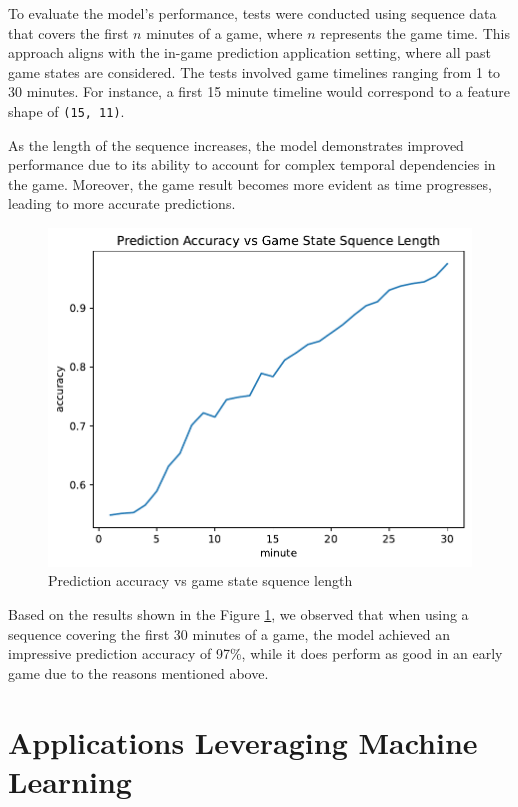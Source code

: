 \documentclass[11pt,a4paper,oneside]{report}
\begin{document}
To evaluate the model's performance, tests were conducted using sequence data that covers the first $n$ minutes of a game, where $n$ represents the game time. This approach aligns with the in-game prediction application setting, where all past game states are considered. The tests involved game timelines ranging from 1 to 30 minutes. For instance, a first 15 minute timeline would correspond to a feature shape of \texttt{(15, 11)}.

As the length of the sequence increases, the model demonstrates improved performance due to its ability to account for complex temporal dependencies in the game. Moreover, the game result becomes more evident as time progresses, leading to more accurate predictions.

\begin{figure}[htbp]
  \centering
  \includegraphics[height=0.4\textheight]{assets/lstm_test_accuracy.pdf}
  \caption{Prediction accuracy vs game state squence length}
  \label{fig:lstm_test_accuracy}
\end{figure}

Based on the results shown in the Figure \ref{fig:lstm_test_accuracy}, we observed that when using a sequence covering the first 30 minutes of a game, the model achieved an impressive prediction accuracy of 97\%, while it does perform as good in an early game due to the reasons mentioned above.

\section{Applications Leveraging Machine Learning}
\end{document}
